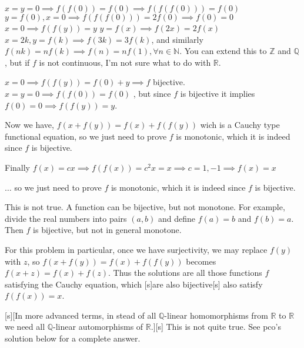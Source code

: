 \begin{solution}
	$x=y=0 \implies f(f(0))=f(0) \implies f(f(f(0)))=f(0)$
$y=f(0), x=0 \implies f(f(f(0)))=2f(0) \implies f(0)=0$
$x=0 \implies f(f(y))=y$
$y=f(x) \implies f(2x)=2f(x)$
$x=2k,y=f(k) \implies f(3k)=3f(k)$, and similarly $ f(nk)=nf(k) \implies f(n)=nf(1), \forall n \in \mathbb N$. 
You can extend this to $\mathbb Z$ and $\mathbb Q$, but if $f$ is not continuous, I'm not sure what to do with $\mathbb R$.
\end{solution}



\begin{solution}
	$x=0 \implies f(f(y))=f(0)+y \implies f$ bijective.
$x=y=0 \implies f(f(0))=f(0)$ , but since $f$ is bijective it implies $f(0)=0 \implies f(f(y))=y$.

Now we have, $f(x+f(y))=f(x)+f(f(y))$ wich is a Cauchy type functional equation, so we just need to prove $f$ is monotonic, which it is indeed since $f$ is bijective.

Finally $f(x)=cx  \implies f(f(x))=c^2 x = x \implies c=1, -1 \implies f(x)=x$
\end{solution}



\begin{solution}
	\begin{tcolorbox}$\ldots$ so we just need to prove $f$ is monotonic, which it is indeed since $f$ is bijective.\end{tcolorbox}
This is not true. A function can be bijective, but not monotone. For example, divide the real numbers into pairs $(a,b)$ and define $f(a)=b$ and $f(b)=a$. Then $f$ is bijective, but not in general monotone.

For this problem in particular, once we have surjectivity, we may replace $f(y)$ with $z$, so $f(x+f(y))=f(x)+f(f(y))$ becomes $f(x+z)=f(x)+f(z)$. Thus the solutions are all those functions $f$ satisfying the Cauchy equation, which [s]are also bijective[\/s] also satisfy $f(f(x))=x$. 

[s][In more advanced terms, in stead of all $\mathbb{Q}$-linear homomorphisms from $\mathbb{R}$ to $\mathbb{R}$ we need all $\mathbb{Q}$-linear automorphisms of $\mathbb{R}$.][\/s] This is not quite true. See pco's solution below for a complete answer.
\end{solution}



